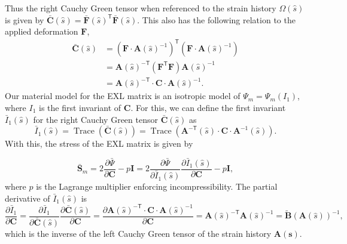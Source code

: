     Thus the right Cauchy Green tensor when referenced to the strain history $\Omega(\hat{s})$ is given by $\mathbf{\bar{C}}(\hat{s}) = \mathbf{\bar{F}}(\hat{s})^\mathsf{T} \mathbf{\bar{F}}(\hat{s})$. This also has the following relation to the applied deformation $\mathbf{F}$,
\begin{equation} \label{eq:rightcauchy}
\begin{split}
\mathbf{\bar{C}}(\hat{s}) &= \left( \mathbf{F}\cdot\mathbf{A}(\hat{s})^{-1} \right)^\mathsf{T} \left(\mathbf{F} \cdot \mathbf{A}(\hat{s})^{-1} \right)\\
	&= \mathbf{A}(\hat{s})^{-\mathsf{T}} \left( \mathbf{F}^\mathsf{T} \mathbf{F} \right) \mathbf{A}(\hat{s})^{-1} \\
	&= \mathbf{A}(\hat{s})^{-\mathsf{T}} \cdot \mathbf{C} \cdot \mathbf{A}(\hat{s})^{-1}.
\end{split}
\end{equation}
    Our material model for the EXL matrix is an isotropic model of $\Psi_m = \Psi_m(I_1)$, where $I_1$ is the first invariant of $\mathbf{C}$. For this, we can define the first invariant $\bar{I}_1(\hat{s})$ for the right Cauchy Green tensor $\bar{\mathbf{C}}(\hat{s})$ as 
\begin{equation}\label{eq:pseudo1stinv}
\bar{I}_1(\hat{s}) = \operatorname{Trace}(\mathbf{\bar{C}}(\hat{s})) = \operatorname{Trace}\left(\mathbf{A}^{-\mathsf{T}}(\hat{s}) \cdot \mathbf{C} \cdot \mathbf{A}^{-1}(\hat{s})\right).
\end{equation}
    With this, the stress of the EXL matrix is given by 

\begin{equation}
\mathbf{\bar{S}}_m = 2 \frac{\partial \bar{\Psi}}{\partial \mathbf{C}} - p\mathbf{I} = 2 \frac{\partial \bar{\Psi}}{\partial \bar{I}_1(\hat{s})} \frac{\partial \bar{I}_1(\hat{s})}{\partial \mathbf{C}} - p\mathbf{I},
\end{equation}
    where $p$ is the Lagrange multiplier enforcing incompressibility. The partial derivative of $\bar{I}_1(\hat{s})$ is
\begin{equation}
\frac{\partial\bar{I}_1}{\partial\mathbf{C}} = \frac{\partial\bar{I}_1}{\partial\bar{\mathbf{C}}(\hat{s})} \frac{\partial\bar{\mathbf{C}}(\hat{s})}{\partial \mathbf{C}}= \frac{\partial\mathbf{A}(\hat{s})^{-\mathsf{T}} \cdot \mathbf{C} \cdot \mathbf{A}(\hat{s})^{-1}}{\partial \mathbf{C}} = \mathbf{A}(\hat{s})^{-\mathsf{T}} \mathbf{A}(\hat{s})^{-1} = \mathbf{\tilde{B}}(\mathbf{A}(\hat{s}))^{-1},
\end{equation}
    which is the inverse of the left Cauchy Green tensor of the strain history $\mathbf{A(s)}$.


